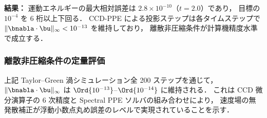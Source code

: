 \textbf{結果：}
運動エネルギーの最大相対誤差は $2.8 \times 10^{-10}$（$t = 2.0$）であり，
目標の $10^{-4}$ を 6 桁以上下回る．
CCD-PPE による投影ステップは各タイムステップで
$\|\bnabla\cdot\bu\|_\infty < 10^{-13}$ を維持しており，
離散非圧縮条件が計算機精度水準で成立する．

\subsubsection{離散非圧縮条件の定量評価}
\label{sec:div_free}

上記 Taylor--Green 渦シミュレーション全 200 ステップを通じて，
$\|\bnabla\cdot\bu\|_\infty$ は $\Ord{10^{-13}}$--$\Ord{10^{-14}}$ に維持される．
これは CCD 微分演算子の 6 次精度と Spectral PPE ソルバの組み合わせにより，
速度場の無発散補正が浮動小数点丸め誤差のレベルで実現されていることを示す．
